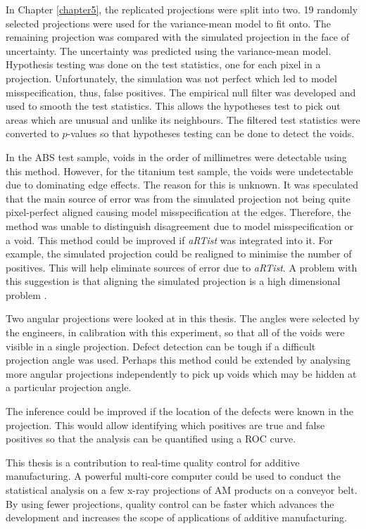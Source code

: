 \documentclass[12pt, a4paper, oneside]{memoir}
\begin{document}
In Chapter \ref{chapter5}, the replicated projections were split into two. 19 randomly selected projections were used for the variance-mean model to fit onto. The remaining projection was compared with the simulated projection in the face of uncertainty. The uncertainty was predicted using the variance-mean model. Hypothesis testing was done on the test statistics, one for each pixel in a projection. Unfortunately, the simulation was not perfect which led to model misspecification, thus, false positives. The empirical null filter was developed and used to smooth the test statistics. This allows the hypotheses test to pick out areas which are unusual and unlike its neighbours. The filtered test statistics were converted to $p$-values so that hypotheses testing can be done to detect the voids.

In the ABS test sample, voids in the order of millimetres were detectable using this method. However, for the titanium test sample, the voids were undetectable due to dominating edge effects. The reason for this is unknown. It was speculated that the main source of error was from the simulated projection not being quite pixel-perfect aligned causing model misspecification at the edges. Therefore, the method was unable to distinguish disagreement due to model misspecification or a void. This method could be improved if \emph{aRTist} was integrated into it. For example, the simulated projection could be realigned to minimise the number of positives. This will help eliminate sources of error due to \emph{aRTist}. A problem with this suggestion is that aligning the simulated projection is a high dimensional problem \citep{brierley2018optimized}.

Two angular projections were looked at in this thesis. The angles were selected by the engineers, in calibration with this experiment, so that all of the voids were visible in a single projection. Defect detection can be tough if a difficult projection angle was used. Perhaps this method could be extended by analysing more angular projections independently to pick up voids which may be hidden at a particular projection angle.

The inference could be improved if the location of the defects were known in the projection. This would allow identifying which positives are true and false positives so that the analysis can be quantified using a ROC curve.

This thesis is a contribution to real-time quality control for additive manufacturing. A powerful multi-core computer could be used to conduct the statistical analysis on a few x-ray projections of AM products on a conveyor belt. By using fewer projections, quality control can be faster which advances the development and increases the scope of applications of additive manufacturing.




\begin{appendices}

\end{appendices}
\end{document}

